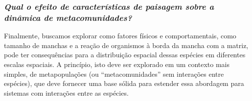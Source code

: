 \documentclass[12pt]{extarticle}
\begin{document}
\subsubsection*{\em Qual o efeito de características de paisagem sobre a
dinâmica de metacomunidades?}

Finalmente, buscamos explorar como fatores físicos e comportamentais, como
tamanho de manchas e a reação de organismos à borda da mancha com a  matriz, %
pode ter consequências para a distribuição espacial dessas espécies em
diferentes escalas espaciais. A princípio, isto deve ser explorado em um
contexto mais simples, de metapopulações \citep{ovaskainen2004} (ou
``metacomunidades'' sem interações entre espécies), que deve fornecer uma base
sólida para estender essa abordagem para sistemas com interações entre as
espécies. 


%
%
%
%
%
\end{document}
